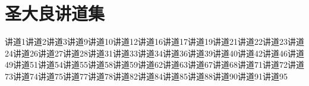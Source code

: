 
\chapter{圣大良讲道集}


讲道1\newline{}讲道2\newline{}讲道3\newline{}讲道9\newline{}讲道10\newline{}讲道12\newline{}讲道16\newline{}讲道17\newline{}讲道19\newline{}讲道21\newline{}讲道22\newline{}讲道23\newline{}讲道24\newline{}讲道26\newline{}讲道27\newline{}讲道28\newline{}讲道31\newline{}讲道33\newline{}讲道34\newline{}讲道36\newline{}讲道39\newline{}讲道40\newline{}讲道42\newline{}讲道46\newline{}讲道49\newline{}讲道51\newline{}讲道54\newline{}讲道55\newline{}讲道58\newline{}讲道59\newline{}讲道62\newline{}讲道63\newline{}讲道67\newline{}讲道68\newline{}讲道71\newline{}讲道72\newline{}讲道73\newline{}讲道74\newline{}讲道75\newline{}讲道77\newline{}讲道78\newline{}讲道82\newline{}讲道84\newline{}讲道85\newline{}讲道88\newline{}讲道90\newline{}讲道91\newline{}讲道95\par

